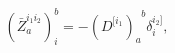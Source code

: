 \begin{equation}
\left( \bar{Z}_{a}^{i_{1}i_{2}}\right) _{i}^{b}=-\left( D^{[i_{1}}\right)
_{a}^{\;\;b}\delta _{i}^{i_{2}]},  \label{i15}
\end{equation}

